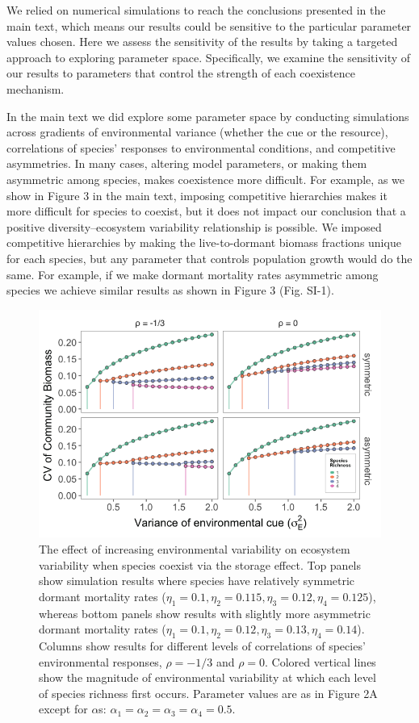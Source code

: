 \documentclass[11pt,]{article}
\begin{document}
We relied on numerical simulations to reach the conclusions presented in
the main text, which means our results could be sensitive to the
particular parameter values chosen. Here we assess the sensitivity of
the results by taking a targeted approach to exploring parameter space.
Specifically, we examine the sensitivity of our results to parameters
that control the strength of each coexistence mechanism.

In the main text we did explore some parameter space by conducting
simulations across gradients of environmental variance (whether the cue
or the resource), correlations of species' responses to environmental
conditions, and competitive asymmetries. In many cases, altering model
parameters, or making them asymmetric among species, makes coexistence
more difficult. For example, as we show in Figure 3 in the main text,
imposing competitive hierarchies makes it more difficult for species to
coexist, but it does not impact our conclusion that a positive
diversity--ecosystem variability relationship is possible. We imposed
competitive hierarchies by making the live-to-dormant biomass fractions
unique for each species, but any parameter that controls population
growth would do the same. For example, if we make dormant mortality
rates asymmetric among species we achieve similar results as shown in
Figure 3 (Fig. SI-1).

\begin{figure}[!ht]
  \centering
      \includegraphics[width=6in]{./components/SI_storage_effect_asymmetric_etas.png}
  \caption{The effect of increasing environmental variability on ecosystem variability when species coexist via the storage effect. Top panels show simulation results where species have relatively symmetric dormant mortality rates ($\eta_1=0.1, \eta_2=0.115, \eta_3=0.12, \eta_4=0.125$), whereas bottom panels show results with slightly more asymmetric dormant mortality rates ($\eta_1=0.1, \eta_2=0.12, \eta_3=0.13, \eta_4=0.14$). Columns show results for different levels of correlations of species' environmental responses, $\rho = -1/3$ and $\rho = 0$. Colored vertical lines show the magnitude of environmental variability at which each level of species richness first occurs. Parameter values are as in Figure 2A except for $\alpha$s: $\alpha_1 = \alpha_2 = \alpha_3 = \alpha_4 = 0.5$.}
\end{figure}
\end{document}

